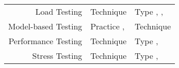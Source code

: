 \begin{paperTable}
\begin{minipage}{\linewidth}
\begin{tabular}{|r|l|l|}
            Load Testing             & Technique \cite[p.~38]{IEEE2021}                                   & Type \cite[p.~253]{IEEE2017}, \cite[pp.~5, 20, 22]{IEEE2022}, \cite{ISTQB}                                                                \\
            Model-based Testing      & Practice \cite[p.~22]{IEEE2022}, \cite[p.~viii]{IEEE2021}          & Technique \cite[p.~4]{Kam2008}                                                                                                            \\
            Performance Testing      & Technique \cite[p.~38]{IEEE2021}                                   & Type \cite[pp.~7, 22, 26\==27]{IEEE2022}, \cite[p.~7]{IEEE2021}                                                                           \\
            Stress Testing           & Technique \cite[p.~38]{IEEE2021}                                   & Type \cite[p.~442]{IEEE2017}, \cite[pp.~9, 22]{IEEE2022}                                                                                  \\
            \hline
        \end{tabular}
    \end{minipage}
\end{paperTable}
